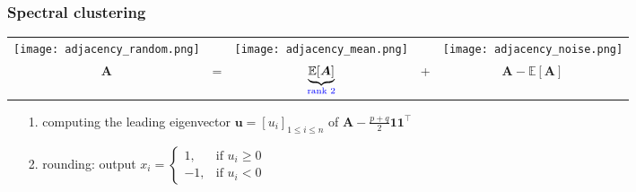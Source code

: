\documentclass[compress,
mathserif,wide,%
]{beamer}
\begin{document}
\begin{frame}
\frametitle{Spectral clustering}

		
\begin{center}
\begin{tabular}{ccccc}
\texttt{[image: adjacency\_random.png]} &   & \texttt{[image: adjacency\_mean.png]} &  & \texttt{[image: adjacency\_noise.png]}\tabularnewline
	$\bm{A}$ & = & $\underset{\textcolor{blue}{ \text{rank 2}}}{\underbrace{\mathbb{E}[\bm{A}]}}$ & + & $\bm{A}-\mathbb{E}\left[\bm{A}\right]$\tabularnewline
\end{tabular}
\end{center}

\vspace{-0.5em}
\begin{itemize}
	\item[{\color{black}1.}] computing the leading eigenvector $\bm{u}=[u_i]_{1\leq i\leq n}$ of $\bm{A} - \frac{p+q}{2}\bm{1}\bm{1}^{\top}$
	\item[{\color{black}2.}] rounding:  output
		${x}_{i}=\begin{cases}
			1, & \text{if }u_{i} \geq 0\\
			-1, & \text{if }u_{i}<0
\end{cases}$
\end{itemize}




\end{frame}
\end{document}

